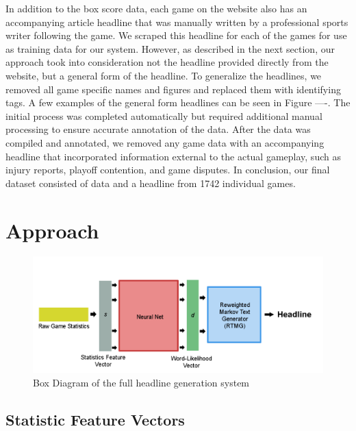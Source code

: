 \documentclass[12pt, journal]{IEEEtran}
\begin{document}
In addition to the box score data, each game on the website also has an accompanying article headline that was manually written by a professional sports writer following the game. We scraped this headline for each of the games for use as training data for our system. However, as described in the next section, our approach took into consideration not the headline provided directly from the website, but a general form of the headline. To generalize the headlines, we removed all game specific names and figures and replaced them with identifying tags. A few examples of the general form headlines can be seen in Figure ----. The initial process was completed automatically but required additional manual processing to ensure accurate annotation of the data. After the data was compiled and annotated, we removed any game data with an accompanying headline that incorporated information external to the actual gameplay, such as injury reports, playoff contention, and game disputes. In conclusion, our final dataset consisted of data and a headline from 1742 individual games.


\section{Approach}

\begin{figure}[t]
\centering
\includegraphics[width=7in]{model_graph.png}
\caption{Box Diagram of the full headline generation system}
\label{model_graph}
\end{figure}

\subsection{Statistic Feature Vectors}
\end{document}
